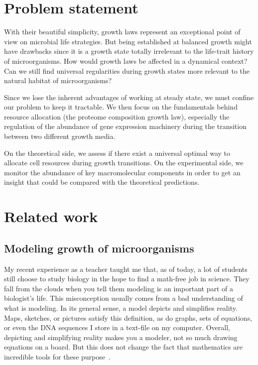 \section{Problem statement}

With their beautiful simplicity, growth laws represent an exceptional point of view on microbial life strategies.
But being established at balanced growth might have drawbacks since it is a growth state totally irrelevant to the life-trait history of microorganisms.
How would growth laws be affected in a dynamical context?
Can we still find universal regularities during growth states more relevant to the natural habitat of microorganisms?

Since we lose the inherent advantages of working at steady state, we must confine our problem to keep it tractable.
We then focus on the fundamentals behind resource allocation (the proteome composition growth law), especially the regulation of the abundance of gene expression machinery during the transition between two different growth media.

On the theoretical side, we assess if there exist a universal optimal way to allocate cell resources during growth transitions.
On the experimental side, we monitor the abundance of key macromolecular components in order to get an insight that could be compared with the theoretical predictions.

\section{Related work}

\subsection{Modeling growth of microorganisms}

My recent experience as a teacher taught me that, as of today, a lot of students still choose to study biology in the hope to find a math-free job in science.
They fall from the clouds when you tell them modeling is an important part of a biologist's life.
This misconception usually comes from a bad understanding of what is modeling.
In its general sense, a model depicts and simplifies reality.
Maps, sketches, or pictures satisfy this definition, as do graphs, sets of equations, or even the DNA sequences I store in a text-file on my computer.
Overall, depicting and simplifying reality makes you a modeler, not so much drawing equations on a board.
But this does not change the fact that mathematics are incredible tools for these purpose~\cite{servedio_not_2014,mcgill_calm_2013}.

